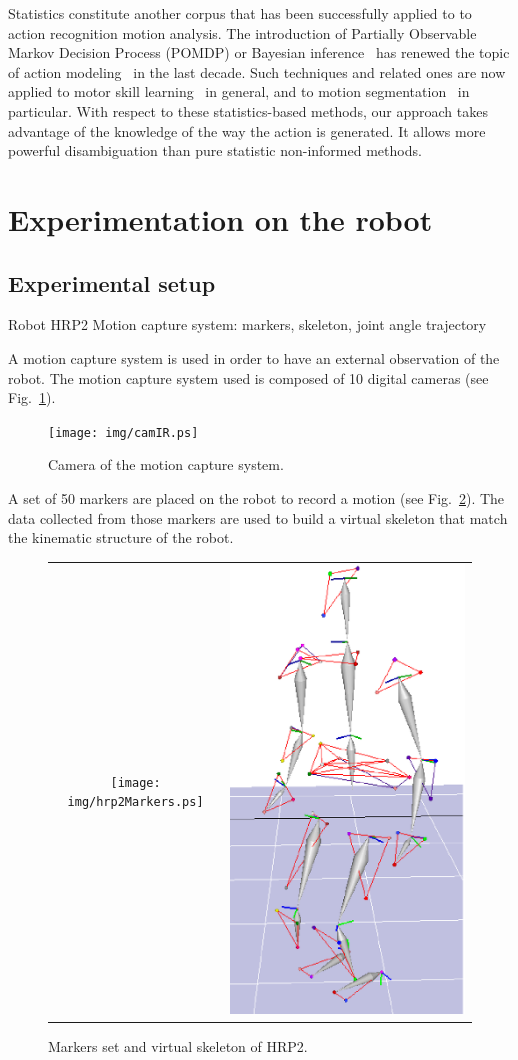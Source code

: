 \documentclass[letterpaper, 10pt, conference]{ieeeconf}      %
\begin{document}
Statistics constitute another corpus that has been successfully applied
to to action recognition motion analysis. The introduction of Partially
Observable Markov Decision Process (POMDP) or Bayesian inference~\cite{pearl88} has
renewed the topic of action modeling~\cite{kaelbling98} in the last decade. Such
techniques and related ones are now applied to motor skill learning~\cite{peters08} in
general, and to motion segmentation~\cite{calinon10, inamura04} in particular. With respect to
these statistics-based methods, our approach takes advantage of the
knowledge of the way the action is generated. It allows more powerful
disambiguation than pure statistic non-informed methods.

\section{Experimentation on the robot}

\subsection{Experimental setup}
Robot HRP2
Motion capture system: markers, skeleton, joint angle trajectory

A motion capture system is used in order to have an external observation of the robot.
The motion capture system used is composed of 10 digital cameras (see Fig.~\ref{fig:camera}). 
\begin{figure}[t]
  \centering
  \texttt{[image: img/camIR.ps]} 
  \caption{Camera of the motion capture system.}
  \label{fig:camera}
\end{figure}

A set of 50 markers
are placed on the robot to record a motion (see Fig.~\ref{fig:hrp2Markers}). The data collected from those markers
are used to build a virtual skeleton that match the kinematic structure of the robot.
\begin{figure}[t]
  \centering
  \begin{tabular}{cc}
    \texttt{[image: img/hrp2Markers.ps]} &
    \includegraphics[height=0.7\linewidth]{img/skel.ps} \\
  \end{tabular}
  \caption{Markers set and virtual skeleton of HRP2.}
  \label{fig:hrp2Markers}
\end{figure}
\end{document}
